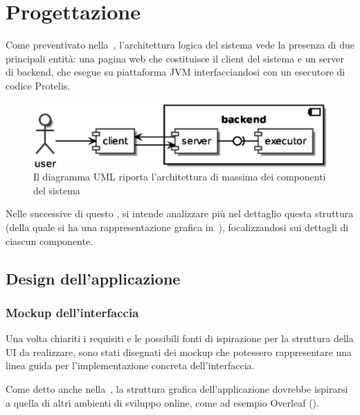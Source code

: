 \chapter{Progettazione}\label{ch:project}

  Come preventivato nella~, l'architettura logica del sistema vede la presenza di due principali entità:
  una pagina web che costituisce il client del sistema e un server di backend, che esegue su piattaforma JVM interfacciandosi con un esecutore di codice Protelis.

  \begin{figure}[htbp]
    \centering
    \includegraphics[width=.8\textwidth]{res/uml/architecture-design.eps}%
    \caption{Il diagramma UML riporta l'architettura di massima dei componenti del sistema}%
    \label{fig:architecture-design}
  \end{figure}

  Nelle  successive di questo , si intende analizzare più nel dettaglio questa struttura (della quale si ha una rappresentazione grafica in~),
  focalizzandosi sui dettagli di ciascun componente.

  \section{Design dell'applicazione}\label{sec:client-design}

    \subsection{Mockup dell'interfaccia}\label{subsec:mockup}
      Una volta chiariti i requisiti e le possibili fonti di ispirazione per la struttura della UI da realizzare, sono stati disegnati dei mockup che potessero rappresentare una linea guida
      per l'implementazione concreta dell'interfaccia.

      Come detto anche nella~, la struttura grafica dell'applicazione dovrebbe ispirarsi a quella di altri ambienti di sviluppo online,
      come ad esempio Overleaf ().

